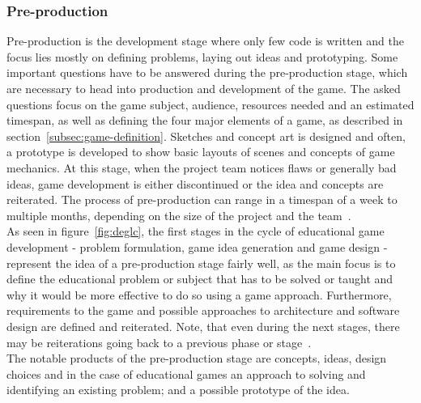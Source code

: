 \subsubsection{Pre-production}\label{subsubsec:pre-production}
Pre-production is the development stage where only few code is written and the focus lies mostly on defining
problems, laying out ideas and prototyping.
Some important questions have to be answered during the pre-production stage, which are necessary to
head into production and development of the game.
The asked questions focus on the game subject, audience, resources needed and an estimated timespan, as well as
defining the four major elements of a game, as described in section~\ref{subsec:game-definition}.
Sketches and concept art is designed and often, a prototype is developed to show basic layouts of scenes and concepts of game mechanics.
At this stage, when the project team notices flaws or generally bad ideas, game development is either discontinued or the idea and concepts are
reiterated.
The process of pre-production can range in a timespan of a week to multiple months, depending on the size of the project and
the team~\cite{cg:game-design-stages}.
\\
As seen in figure~\ref{fig:deglc}, the first stages in the cycle of educational game development - problem formulation, game idea generation and game design
- represent the idea of a pre-production stage fairly well,
as the main focus is to define the educational problem or subject that has to be solved or taught and why it would be more effective
to do so using a game approach.
Furthermore, requirements to the game and possible approaches to architecture and software design are defined and reiterated.
Note, that even during the next stages, there may be reiterations going back to a previous phase or stage~\cite{GAMED}.
\\
The notable products of the pre-production stage are concepts, ideas, design choices and in the case of educational games an approach to solving and identifying
an existing problem;
and a possible prototype of the idea.

